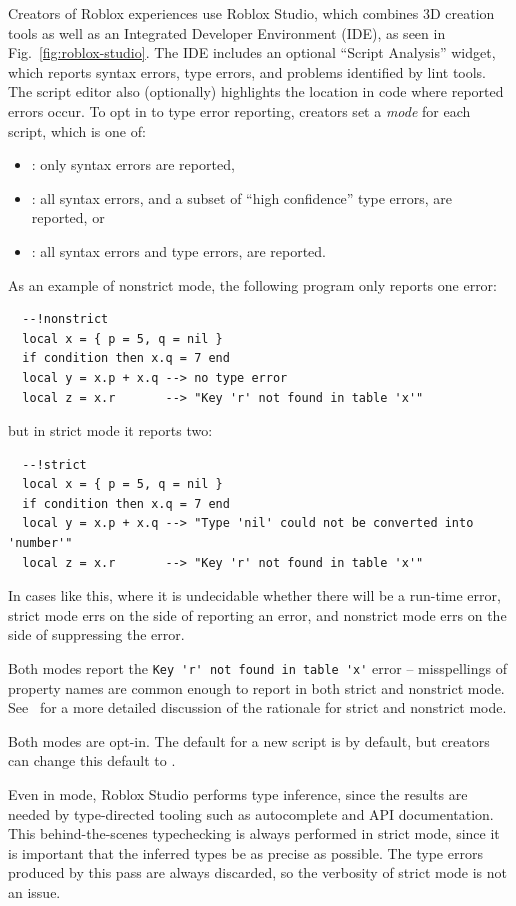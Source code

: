 \documentclass[english,submission,cleveref]{programming}
\begin{document}
Creators of {Roblox experiences} use {Roblox Studio},
which combines {3D creation} tools as well as an Integrated
Developer Environment (IDE), as seen in Fig.~\ref{fig:roblox-studio}.
The IDE includes an optional ``Script Analysis'' widget, which
reports syntax errors, type errors, and problems identified by
lint tools. The script editor also (optionally) highlights
the location in code where reported errors occur.
To opt in to type error reporting, creators set a \emph{mode}
for each script, which is one of:
\begin{itemize}
  \item \mnocheck{}: only syntax errors are reported,
  \item \mnonstrict{}: all syntax errors, and a subset of ``high confidence'' type errors, are reported, or
  \item \mstrict{}: all syntax errors and type errors, are reported.
\end{itemize}
As an example of nonstrict mode, the following program only reports one error:
\begin{verbatim}
  --!nonstrict
  local x = { p = 5, q = nil }
  if condition then x.q = 7 end
  local y = x.p + x.q --> no type error
  local z = x.r       --> "Key 'r' not found in table 'x'"
\end{verbatim}
but in strict mode it reports two:
\begin{verbatim}
  --!strict
  local x = { p = 5, q = nil }
  if condition then x.q = 7 end
  local y = x.p + x.q --> "Type 'nil' could not be converted into 'number'"
  local z = x.r       --> "Key 'r' not found in table 'x'"
\end{verbatim}
In cases like this, where it is undecidable whether there will be a run-time error,
strict mode errs on the side of reporting an error, and nonstrict mode errs on
the side of suppressing the error.

Both modes report the \verb|Key 'r' not found in table 'x'| error --
misspellings of property names are common enough to report in both
strict and nonstrict mode. See~\cite{bfj-hatra-2021}
for a more detailed discussion of the rationale for strict and nonstrict mode.

Both modes are opt-in. The default for a new script is \mnocheck{} by
default, but creators can change this default to \mnonstrict{}.

Even in \mnocheck{} mode, {Roblox Studio} performs type inference, since
the results are needed by type-directed tooling such as autocomplete and
API documentation. This behind-the-scenes typechecking is always performed
in strict mode, since it is important that the inferred types be as precise
as possible. The type errors produced by this pass are always discarded,
so the verbosity of strict mode is not an issue.
\end{document}
